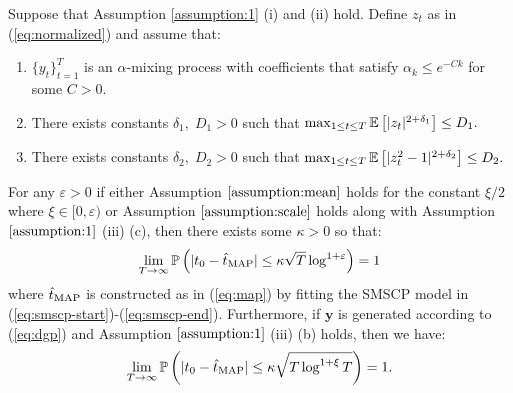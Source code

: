 \begin{theorem}\label{theorem:smscp}
    Suppose that Assumption \ref{assumption:1} (i) and (ii) hold. Define $z_t$ as in (\ref{eq:normalized}) and assume that:
    \vspace{-10pt}
    \begin{enumerate}[label=(\roman*)]
        \item $\{y_t\}_{t=1}^T$ is an $\alpha$-mixing process with coefficients that satisfy $\alpha_k \leq e^{-Ck}$ for some $C > 0$.
        \item There exists constants $\delta_1, \; D_1 > 0$ such that $\max_{1\leq t \leq T} \E\left[|z_t|^{2+\delta_1}\right]\leq D_1.$ 
        \item There exists constants $\delta_2, \; D_2 > 0$ such that $\max_{1\leq t \leq T} \E\left[|z_t^2 - 1|^{2+\delta_2}\right]\leq D_2.$ 
    \end{enumerate}
    \vspace{-5pt}
    For any $\varepsilon > 0$ if either Assumption $\ref{assumption:mean}$ holds for the constant $\xi / 2$ where $\xi \in [0,\varepsilon)$ or Assumption $\ref{assumption:scale}$ holds along with Assumption $\ref{assumption:1}$ (iii) (c), then there exists some $\kappa > 0$ so that: 
    \vspace{-5pt}
    \begin{align*}
        \lim_{T\to\infty}\Pr\left(|t_0 - \hat{t}_{\normalfont \text{MAP}}| \leq \kappa \sqrt{T}\log^{1+\varepsilon}\right) = 1  
    \end{align*}
    where $\hat{t}_{\normalfont \text{MAP}}$ is constructed as in (\ref{eq:map}) by fitting the SMSCP model in (\ref{eq:smscp-start})-(\ref{eq:smscp-end}). Furthermore, if $\mathbf{y}$ is generated according to (\ref{eq:dgp}) and Assumption $\ref{assumption:1}$ (iii) (b) holds, then we have:
        \vspace{-5pt}
    \begin{align*}
        \lim_{T\to\infty}\Pr\left(|t_0 - \hat{t}_{\normalfont \text{MAP}}| \leq \kappa \sqrt{T\log^{1+\xi} T}\right) = 1 .
    \end{align*}
\end{theorem}
